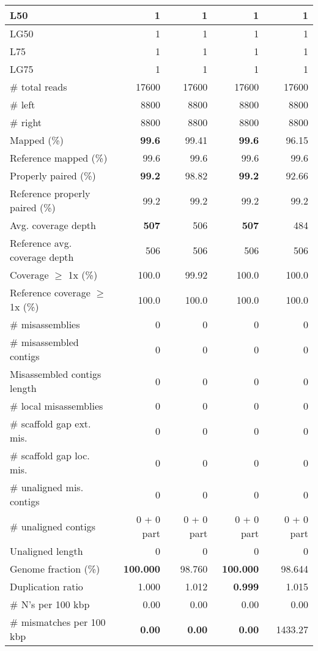 \documentclass[12pt,a4paper]{article}
\begin{document}
\begin{table}[ht]
\begin{center}
\begin{tabular}{|l*{4}{|r}|}
L50 & 1 & 1 & 1 & 1 \\ \hline
LG50 & 1 & 1 & 1 & 1 \\ \hline
L75 & 1 & 1 & 1 & 1 \\ \hline
LG75 & 1 & 1 & 1 & 1 \\ \hline
\# total reads & 17600 & 17600 & 17600 & 17600 \\ \hline
\# left & 8800 & 8800 & 8800 & 8800 \\ \hline
\# right & 8800 & 8800 & 8800 & 8800 \\ \hline
Mapped (\%) & {\bf 99.6} & 99.41 & {\bf 99.6} & 96.15 \\ \hline
Reference mapped (\%) & 99.6 & 99.6 & 99.6 & 99.6 \\ \hline
Properly paired (\%) & {\bf 99.2} & 98.82 & {\bf 99.2} & 92.66 \\ \hline
Reference properly paired (\%) & 99.2 & 99.2 & 99.2 & 99.2 \\ \hline
Avg. coverage depth & {\bf 507} & 506 & {\bf 507} & 484 \\ \hline
Reference avg. coverage depth & 506 & 506 & 506 & 506 \\ \hline
Coverage $\geq$ 1x (\%) & 100.0 & 99.92 & 100.0 & 100.0 \\ \hline
Reference coverage $\geq$ 1x (\%) & 100.0 & 100.0 & 100.0 & 100.0 \\ \hline
\# misassemblies & 0 & 0 & 0 & 0 \\ \hline
\# misassembled contigs & 0 & 0 & 0 & 0 \\ \hline
Misassembled contigs length & 0 & 0 & 0 & 0 \\ \hline
\# local misassemblies & 0 & 0 & 0 & 0 \\ \hline
\# scaffold gap ext. mis. & 0 & 0 & 0 & 0 \\ \hline
\# scaffold gap loc. mis. & 0 & 0 & 0 & 0 \\ \hline
\# unaligned mis. contigs & 0 & 0 & 0 & 0 \\ \hline
\# unaligned contigs & 0 + 0 part & 0 + 0 part & 0 + 0 part & 0 + 0 part \\ \hline
Unaligned length & 0 & 0 & 0 & 0 \\ \hline
Genome fraction (\%) & {\bf 100.000} & 98.760 & {\bf 100.000} & 98.644 \\ \hline
Duplication ratio & 1.000 & 1.012 & {\bf 0.999} & 1.015 \\ \hline
\# N's per 100 kbp & 0.00 & 0.00 & 0.00 & 0.00 \\ \hline
\# mismatches per 100 kbp & {\bf 0.00} & {\bf 0.00} & {\bf 0.00} & 1433.27 \\ \hline

\end{tabular}
\end{center}
\end{table}
\end{document}
